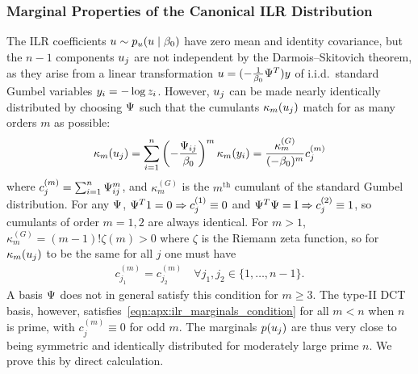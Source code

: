 \subsubsection{Marginal Properties of the Canonical \gls*{ILR} Distribution}\label{sec:apx:ilr_marginals}

The \gls*{ILR} coefficients $u \sim p_{u}(u \mid \beta_{0})$ have zero mean and identity covariance, but the $n-1$ components $u_j$ are not independent by the Darmois--Skitovich theorem, as they arise from a linear transformation $u = (-\frac{1}{\beta_{0}} \Psi^T) y$ of i.i.d.\ standard Gumbel variables $y_i = -\log z_{i}$.
However, $u_j$ can be made nearly identically distributed by choosing $\Psi$ such that the cumulants $\kappa_{m}(u_j)$ match for as many orders $m$ as possible:
\begin{align}
    \kappa_{m}(u_j)
    = \sum_{i=1}^{n} \left(-\frac{\Psi_{ij}}{\beta_{0}}\right)^m \kappa_{m}(y_i)
    = \frac{\kappa_{m}^{(G)}}{(-\beta_{0})^m} c_{j}^{(m)}
\end{align}
where $c_{j}^{(m)} = \sum_{i=1}^{n} \Psi_{ij}^m$, and $\kappa_{m}^{(G)}$ is the $m^{\text{th}}$ cumulant of the standard Gumbel distribution.
For any $\Psi$, $\Psi^T \mathrm{1} = \mathrm{0} \Rightarrow c_{j}^{(1)} \equiv 0$ and $\Psi^T \Psi = \mathrm{I} \Rightarrow c_{j}^{(2)} \equiv 1$, so cumulants of order $m=1,2$ are always identical.
For $m > 1$, $\kappa_{m}^{(G)} = (m-1)! \zeta(m) > 0$ where $\zeta$ is the Riemann zeta function, so for $\kappa_{m}(u_j)$ to be the same for all $j$ one must have
\begin{align}\label{eqn:apx:ilr_marginals_condition}
    c_{j_1}^{(m)} = c_{j_2}^{(m)} \quad \forall j_1, j_2 \in \{1, \ldots, n-1\}.
\end{align}
A basis $\Psi$ does not in general satisfy this condition for $m \ge 3$.
The type-II \gls*{DCT} basis, however, satisfies~\eqref{eqn:apx:ilr_marginals_condition} for all $m < n$ when $n$ is prime, with $c_{j}^{(m)} \equiv 0$ for odd $m$.
The marginals $p(u_j)$ are thus very close to being symmetric and identically distributed for moderately large prime $n$.
We prove this by direct calculation.

